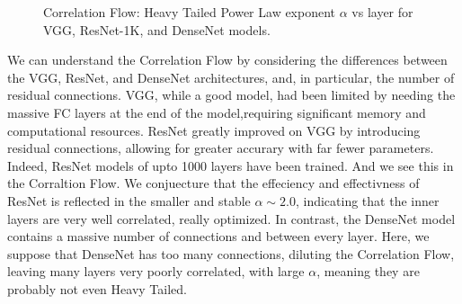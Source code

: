 

\begin{figure}[t]
    \centering

    \qquad
    \qquad
    \caption{Correlation Flow: Heavy Tailed Power Law exponent $\alpha$ vs layer for VGG, ResNet-1K, and DenseNet models.}
    \label{fig:vgg-alpha-layers}
\end{figure}

We can understand the Correlation Flow by considering the differences between the VGG, ResNet, and DenseNet architectures,
and, in particular, the number of residual connections.  VGG, while a good model, had been limited by needing the massive
FC layers at the end of the model,requiring significant memory and computational resources.  ResNet greatly improved
on VGG by introducing residual connections, allowing for greater accurary with far fewer parameters.
Indeed, ResNet models of upto 1000 layers have been trained. And we see this in the Corraltion Flow.
We conjuecture that the effeciency and effectivness of ResNet is reflected in the smaller and stable
$\alpha\sim 2.0$,  indicating that the inner layers are very well correlated, really optimized.
In contrast, the DenseNet model contains a massive number of connections and between every layer.
Here, we suppose that DenseNet has too many connections, diluting the Correlation Flow, leaving
many layers very poorly correlated, with large $\alpha$, meaning they are probably not even Heavy Tailed.
